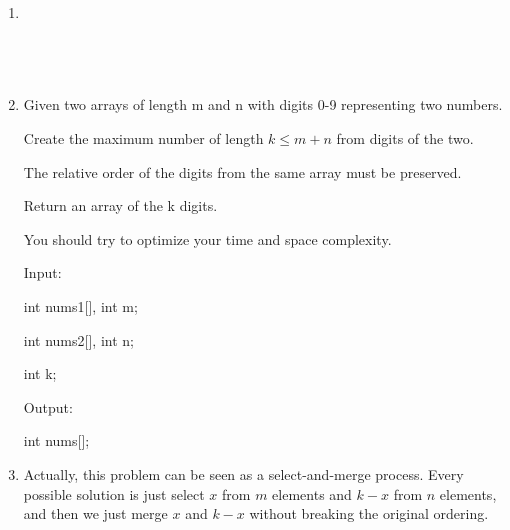 \documentclass[12pt,a4paper]{article}
\makeatletter
\newtheorem*{solution}{Solution}
\renewenvironment{solution}[1][Solution] {\par\pushQED{\qed}\normalfont\topsep6\p@\@plus6\p@\relax\trivlist\item[\hskip\labelsep\bfseries#1\@addpunct{.}]\ignorespaces}{\popQED\endtrivlist\@endpefalse} \makeatother
\makeatother
\begin{document}
\begin{enumerate}
\begin{solution}
\end{solution}

~\\
~\\
~\\
~\\

\item Given two arrays of length m and n with digits 0-9 representing two numbers.

Create the maximum number of length $ k \leq m + n $ from digits of the two.

The relative order of the digits from the same array must be preserved.

Return an array of the k digits.

You should try to optimize your time and space complexity.
















Input:

int nums1[], int m;

int nums2[], int n;

int k;

Output:

int nums[];

\begin{solution}

Actually, this problem can be seen as a select-and-merge process. Every possible solution is just select $x$ from $m$ elements and $k-x$ from $n$ elements, and then we just merge $x$ and $k-x$ without breaking the original ordering.\\


\end{solution}
\end{enumerate}
\end{document}
